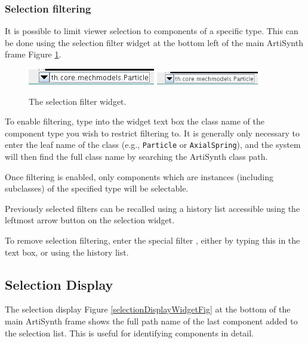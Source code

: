 \documentclass{article}
\begin{document}
\subsubsection{Selection filtering}
\label{selectionFiltersSec}

It is possible to limit viewer selection to components of a specific
type. This can be done using the selection filter widget at the bottom
left of the main ArtiSynth frame Figure \ref{selectionFilterWidgetFig}.

\begin{figure}
\begin{center}
\iflatexml
\includegraphics[]{images/selectionFilterWidget}
\else
\includegraphics[width=0.40\textwidth]{images/selectionFilterWidget}
\fi
\end{center}
\caption{The selection filter widget.}%
\label{selectionFilterWidgetFig}
\end{figure}

To enable filtering, type into the widget text box the class name of
the component type you wish to restrict filtering to. It is generally
only necessary to enter the leaf name of the class (e.g., {\tt Particle}
or {\tt AxialSpring}), and the system will then find the full
class name by searching the ArtiSynth class path.

Once filtering is enabled, only components which are instances
(including subclasses) of the specified type will be selectable.

Previously selected filters can be recalled using a history
list accessible using the leftmost arrow button on the
selection widget.

To remove selection filtering, enter the special filter {\tt *}, either by
typing this in the text box, or using the history list.

\subsection{Selection Display}
\label{selectionDisplaySec}

The selection display Figure \ref{selectionDisplayWidgetFig} at the bottom of the
main ArtiSynth frame shows the full path name of the last component
added to the selection list. This is useful for identifying components
in detail.
\end{document}
